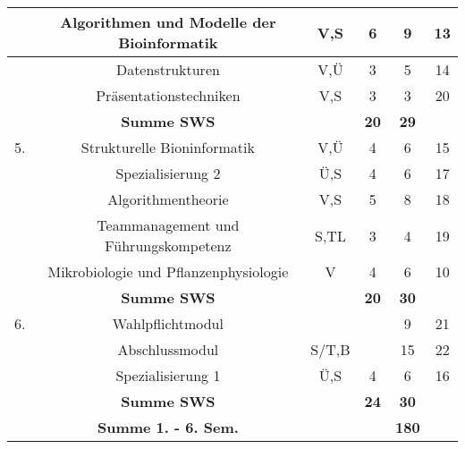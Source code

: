 \begin{addmargin}[-5mm]{0cm}
\begin{center}
\begin{tabular}{|c|cc|c|c|c|}
\hline  & Algorithmen und Modelle der Bioinformatik & V,S & 6 & 9 & 13 \\ 
\hline  & Datenstrukturen & V,Ü & 3 & 5 & 14 \\ 
\hline  & Präsentationstechniken & V,S & 3 & 3 & 20 \\
\hline  & \textbf{Summe SWS}&  & \textbf{20} & \textbf{29} &  \\
\hline 5. & Strukturelle Bioninformatik & V,Ü & 4 & 6 & 15 \\ 
          & Spezialisierung 2 & Ü,S & 4 & 6 & 17 \\ 
\hline  & Algorithmentheorie & V,S & 5 & 8 & 18 \\ 
\hline  & Teammanagement und Führungskompetenz & S,TL & 3 & 4 & 19 \\
\hline  & Mikrobiologie und Pflanzenphysiologie & V & 4 & 6 & 10 \\
\hline  & \textbf{Summe SWS}&  & \textbf{20} & \textbf{30} &  \\
\hline 6. & Wahlpflichtmodul &  &  & 9 & 21 \\ 
\hline  & Abschlussmodul & S/T,B &  & 15 & 22 \\ 
\hline  & Spezialisierung 1 & Ü,S & 4 & 6 & 16 \\
\hline  & \textbf{Summe SWS} &  & \textbf{24} & \textbf{30} &  \\ 
\hline  & \textbf{Summe 1. - 6. Sem.} &  &  & \textbf{180} &  \\ 
\hline 
\end{tabular} 

\end{center}

\end{addmargin}

